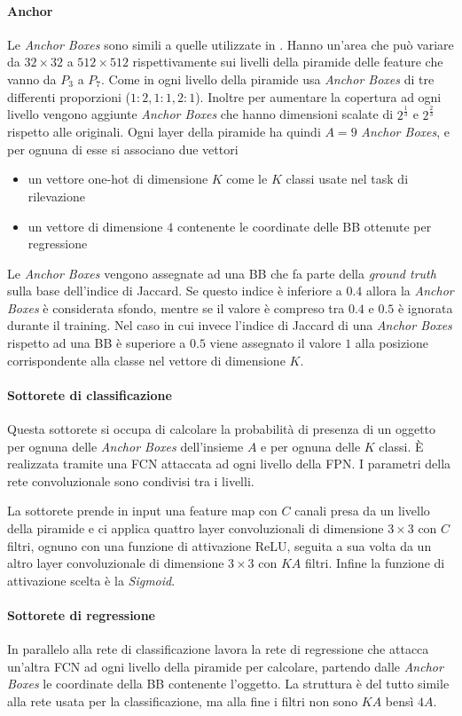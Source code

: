\paragraph{Anchor}
Le \textit{Anchor Boxes} sono simili a quelle utilizzate in \cite{lin2017feature}. Hanno un'area che può variare da $32 \times 32$ a $512 \times 512$ rispettivamente sui livelli della piramide delle feature che vanno da $P_3$ a $P_7$. Come in \cite{lin2017feature} ogni livello della piramide usa \textit{Anchor Boxes} di tre differenti proporzioni ($1:2, 1:1, 2:1$). Inoltre per aumentare la copertura ad ogni livello vengono aggiunte \textit{Anchor Boxes} che hanno dimensioni scalate di $2^\frac{1}{3}$ e $2^\frac{2}{3}$ rispetto alle originali. Ogni layer della piramide ha quindi $A=9$ \textit{Anchor Boxes}, e per ognuna di esse si associano due vettori 
\begin{itemize}
    \item un vettore one-hot di dimensione $K$ come le $K$ classi usate nel task di rilevazione
    \item un vettore di dimensione $4$ contenente le coordinate delle \ac{BB} ottenute per regressione
\end{itemize}
Le \textit{Anchor Boxes} vengono assegnate ad una \ac{BB} che fa parte della \textit{ground truth} sulla base dell'indice di Jaccard. Se questo indice è inferiore a $0.4$ allora la \textit{Anchor Boxes} è considerata sfondo, mentre se il valore è compreso tra $0.4$ e $0.5$ è ignorata durante il training.
Nel caso in cui invece l'indice di Jaccard di una \textit{Anchor Boxes} rispetto ad una \ac{BB} è superiore a $0.5$ viene assegnato il valore $1$ alla posizione corrispondente alla classe nel vettore di dimensione $K$.

\paragraph{Sottorete di classificazione}
Questa sottorete si occupa di calcolare la probabilità di presenza di un oggetto per ognuna delle \textit{Anchor Boxes} dell'insieme $A$ e per ognuna delle $K$ classi. È realizzata tramite una \ac{FCN} attaccata ad ogni livello della \ac{FPN}. I parametri della rete convoluzionale sono condivisi tra i livelli. 

La sottorete prende in input una feature map con $C$ canali presa da un livello della piramide e ci applica quattro layer convoluzionali di dimensione $3 \times 3$ con $C$ filtri, ognuno con una funzione di attivazione ReLU, seguita a sua volta da un altro layer convoluzionale di dimensione $3 \times 3$ con $KA$ filtri. 
Infine la funzione di attivazione scelta è la \textit{Sigmoid}.
\paragraph{Sottorete di regressione}
In parallelo alla rete di classificazione lavora la rete di regressione che attacca un'altra \ac{FCN} ad ogni livello della piramide per calcolare, partendo dalle \textit{Anchor Boxes} le coordinate della \ac{BB} contenente l'oggetto. La struttura è del tutto simile alla rete usata per la classificazione, ma alla fine i filtri non sono $KA$ bensì $4A$. 


